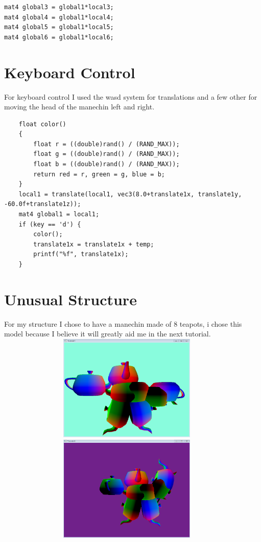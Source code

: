 \documentclass{article}
\begin{document}
\begin{lstlisting}
mat4 global3 = global1*local3;
mat4 global4 = global1*local4;
mat4 global5 = global1*local5;
mat4 global6 = global1*local6;
\end{lstlisting}


\section{Keyboard Control}
For keyboard control I used the wasd system for translations and a few other for moving the head of the manechin left and right.
\begin{lstlisting}
	float color()
	{
		float r = ((double)rand() / (RAND_MAX));
		float g = ((double)rand() / (RAND_MAX));
		float b = ((double)rand() / (RAND_MAX));
		return red = r, green = g, blue = b;
	}
	local1 = translate(local1, vec3(8.0+translate1x, translate1y, -60.0f+translate1z));
	mat4 global1 = local1;
	if (key == 'd') {
		color();
		translate1x = translate1x + temp;
		printf("%f", translate1x);
	}
\end{lstlisting}



\section{Unusual Structure}
For my structure I chose to have a manechin made of 8 teapots, i chose this model because I believe it will greatly aid me in the next tutorial.
\includegraphics[height=2in,width=5in]{42.PNG}
\includegraphics[height=2in,width=5in]{43.PNG}





	
\end{document}
